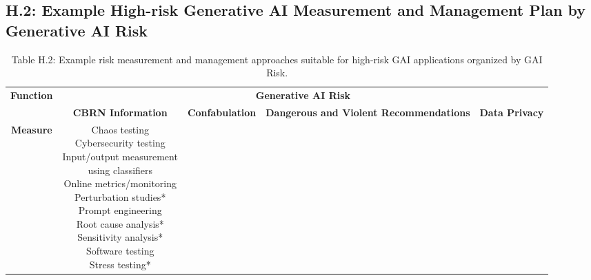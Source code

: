 \documentclass[fleqn]{article}
\begin{document}
\begin{landscape}
\vfill
\raisebox{-10pt}{\makebox[\linewidth]{\thepage}}

\pagebreak
\thispagestyle{empty}

\subsection*{H.2: Example High-risk Generative AI Measurement and Management Plan by Generative AI Risk}\label{appdxh2}

\begin{table}[H]
	\caption*{Table H.2: Example risk measurement and management approaches suitable for high-risk GAI applications organized by GAI Risk.}
	\footnotesize
	\begin{tabular}{|c|c|c|c|c|}
		\hline
		\multirow{2}{*}{\textbf{Function}} & \multicolumn{4}{|c|}{\textbf{Generative AI Risk}}   \\
		\cline{2-5}
		& \textbf{CBRN Information} & \textbf{Confabulation} & \textbf{Dangerous and Violent Recommendations} & \textbf{Data Privacy} \\
		\hline	
		\textbf{Measure} & 
		\makecell[l]{	
			\textbullet\hspace{3pt} Chaos testing\\  	
			\textbullet\hspace{3pt} Cybersecurity testing\\  	
			\textbullet\hspace{3pt} Input/output measurement\\\hspace{10pt}using classifiers \\ 
			\textbullet\hspace{3pt} Online metrics/monitoring\\  	
			\textbullet\hspace{3pt} Perturbation studies*\\  	
			\textbullet\hspace{3pt} Prompt engineering\\  		
			\textbullet\hspace{3pt} Root cause analysis*\\  	
			\textbullet\hspace{3pt} Sensitivity analysis*\\  	
			\textbullet\hspace{3pt} Software testing\\  	
			\textbullet\hspace{3pt} Stress testing*\\  	
}
\end{tabular}
\end{table}
\end{landscape}
\end{document}
